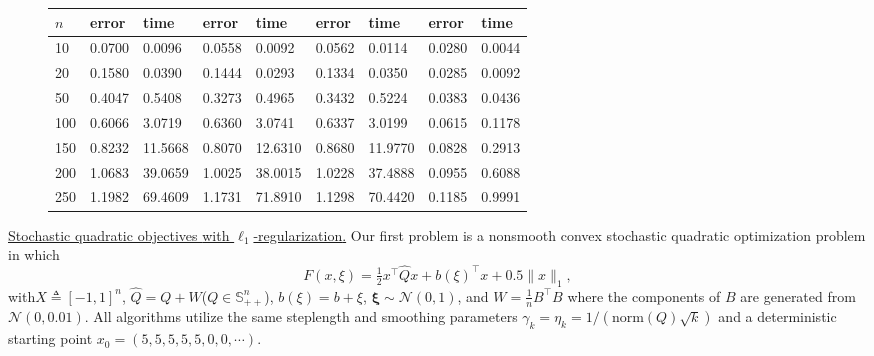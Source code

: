 \documentclass[11pt,reqno]{amsart}
\newcommand{\1}{{\bf 1}}
\newcommand{\2}{{\bf 2}}
\newcommand{\bxi}{\boldsymbol{\xi}}
\numberwithin{equation}{section}
\theoremstyle{remark}
\begin{document}
{\begin{figure}[htb]
\begin{minipage}{0.51\textwidth}
\begin{tabular}{ |p{0.25cm} |p{0.53cm}|p{0.65cm}|p{0.53cm}|p{0.63cm}|p{0.53cm}|p{0.63cm}| p{0.53cm}| p{0.53cm}|}
							\hline
							$n$ &error&time&error&time&error&time&error&time\\
							\hline
							10  & 0.0700   & 0.0096  & 0.0558&0.0092&0.0562&0.0114&0.0280&0.0044 \\
							\hline
							20 & 0.1580  & 0.0390 &0.1444 &0.0293&0.1334&0.0350&0.0285&0.0092 \\
							\hline
							50  &  0.4047  &0.5408   &0.3273 &0.4965&0.3432&0.5224&0.0383&0.0436\\
							\hline
							100 &0.6066 & 3.0719  &0.6360 &3.0741&0.6337&3.0199&0.0615&0.1178\\
							\hline
							150 & 0.8232   & 11.5668  & 0.8070&12.6310&0.8680&11.9770&0.0828&0.2913\\
							\hline
							200 &  1.0683  & 39.0659  & 1.0025&38.0015&1.0228&37.4888&0.0955&0.6088\\
							\hline
							250 & 1.1982   & 69.4609  &1.1731 &71.8910&1.1298&70.4420&0.1185&0.9991\\
							\hline
						\end{tabular}
					\end{minipage}
				\end{figure}
				
				\underline{Stochastic quadratic objectives {with $\ell_1$-regularization}.}
				Our first problem is a nonsmooth convex stochastic quadratic optimization problem in which $$F(x,\xi) =\tfrac{1}{2}x^\top \hat{Q}x+b(\xi)^\top x+ 0.5\|x\|_1,$$ with$X \triangleq [-1,1]^n$, $\hat{Q}=Q+W${($Q \in \mathbb{S}^n_{++}$)}, $b(\xi)=b+\xi$, {$\bxi \sim \mathcal{N}(0,1)$}, and $W=\tfrac{1}{n}B^\top B$ where the components of $B$ are generated from $\mathcal{N}(0,0.01)$. All algorithms utilize the same steplength and smoothing parameters $\gamma_k=\eta_k=1/(\text{norm}(Q)\sqrt{{k}})$ and a deterministic starting point $x_0=(5,5,5,5,5,0,0,\cdots)$.  
				
}
\end{document}
